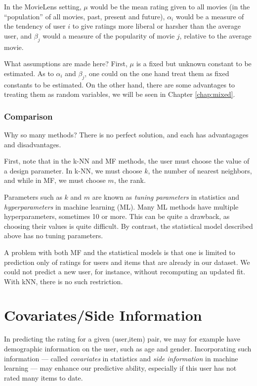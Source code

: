 In the MovieLens setting, $\mu$ would be the mean rating given to all
movies (in the ``population'' of all movies, past, present and future),
$\alpha_i$ would be a measure of the tendency of user $i$ to give
ratings more liberal or harsher than the average user, and $\beta_j$
would a measure of the popularity of movie $j$, relative to the average
movie.

What assumptions are made here?  First, $\mu$ is a fixed but unknown
constant to be estimated.  As to $\alpha_i$ and $\beta_j$, one could on
the one hand treat them as fixed constants to be estimated.  On the
other hand, there are some advantages to treating them as random
variables, we will be seen in Chapter \ref{chap:mixed}.

\subsubsection{Comparison}

Why so many methods?  There is no perfect solution, and each has
advantagages and disadvantages.

First, note that in the k-NN and MF methods, the user must choose the
value of a design parameter.  In k-NN, we must choose $k$, the number of
nearest neighbors, and while in MF, we must choose $m$, the rank.

Parameters such as $k$ and $m$ are known as \textit{tuning parameters}
in statistics and \textit{hyperparameters} in machine learning (ML).
Many ML methods have multiple hyperparameters, sometimes 10 or more.
This can be quite a drawback, as choosing their values is quite
difficult.  By contrast, the statistical model described above has no
tuning parameters.

A problem with both MF and the statistical models is that one is limited
to prediction only of ratings for users and items that are already in
our dataset.  We could not predict a new user, for instance, without
recomputing an updated fit.  With kNN, there is no such restriction.

\section{Covariates/Side Information}

In predicting the rating for a given (user,item) pair, we may for
example have demographic information on the user, such as age and
gender.  Incorporating such information --- called \textit{covariates}
in statistics and \textit{side information} in machine learning --- may
enhance our predictive ability, especially if this user has not rated
many items to date.

